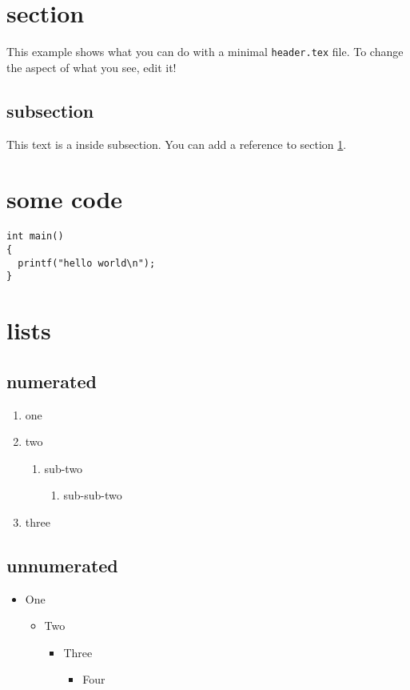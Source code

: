 
\maketitle


\section{section}
\label{sec:orgf82a136}
This example shows what you can do with a minimal \texttt{header.tex} file.
To change the aspect of what you see, edit it!
\subsection{subsection}
\label{sec:org67c3da1}
This text is a inside subsection. You can add a reference to section \ref{sec:orgf82a136}.

\section{some code}
\label{sec:org2e18a95}
\begin{verbatim}
int main()
{
  printf("hello world\n");
}
\end{verbatim}
\section{lists}
\label{sec:org03d34ca}
\subsection{numerated}
\label{sec:orgde0220e}
\begin{enumerate}
\item one
\item two
\begin{enumerate}
\item sub-two
\begin{enumerate}
\item sub-sub-two
\end{enumerate}
\end{enumerate}
\item three
\end{enumerate}

\subsection{unnumerated}
\label{sec:orga142588}
\begin{itemize}
\item One
\begin{itemize}
\item Two
\begin{itemize}
\item Three
\begin{itemize}
\item Four
\end{itemize}
\end{itemize}
\end{itemize}
\end{itemize}

